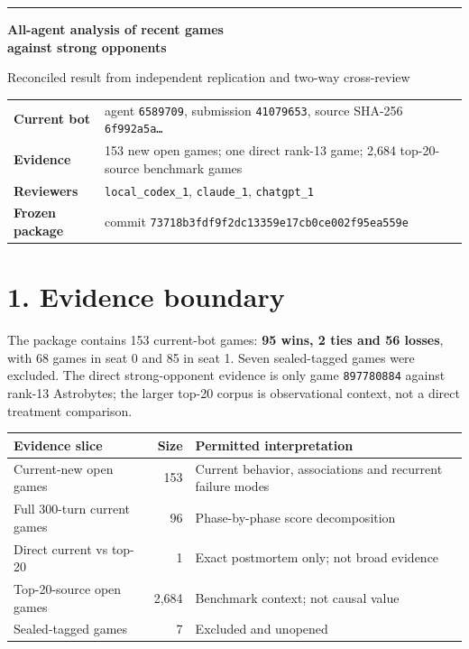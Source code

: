\documentclass[10pt,a4paper]{article}
\begin{document}
{\color{accent}\rule{\textwidth}{1.4pt}}

{\Huge\bfseries\color{ink} All-agent analysis of recent games\\[2mm]
against strong opponents}

{\large\color{muted} Reconciled result from independent replication and two-way cross-review}

\vspace{2mm}
\begin{tabularx}{\textwidth}{@{}lY@{}}
\textbf{Current bot} & agent \texttt{6589709}, submission \texttt{41079653}, source SHA-256 \texttt{6f992a5a…} \\
\textbf{Evidence} & 153 new open games; one direct rank-13 game; 2,684 top-20-source benchmark games \\
\textbf{Reviewers} & \texttt{local\_codex\_1}, \texttt{claude\_1}, \texttt{chatgpt\_1} \\
\textbf{Frozen package} & commit \texttt{73718b3fdf9f2dc13359e17cb0ce002f95ea559e} \\
\end{tabularx}

\vspace{3mm}

\section*{1. Evidence boundary}

The package contains 153 current-bot games: \textbf{95 wins, 2 ties and 56 losses}, with
68 games in seat 0 and 85 in seat 1. Seven sealed-tagged games were excluded. The direct
strong-opponent evidence is only game \texttt{897780884} against rank-13 Astrobytes; the
larger top-20 corpus is observational context, not a direct treatment comparison.

\begin{tabularx}{\textwidth}{@{}l r Y@{}}
\toprule
\textbf{Evidence slice} & \textbf{Size} & \textbf{Permitted interpretation} \\
\midrule
Current-new open games & 153 & Current behavior, associations and recurrent failure modes \\
Full 300-turn current games & 96 & Phase-by-phase score decomposition \\
Direct current vs top-20 & 1 & Exact postmortem only; not broad evidence \\
Top-20-source open games & 2,684 & Benchmark context; not causal value \\
Sealed-tagged games & 7 & Excluded and unopened \\
\bottomrule
\end{tabularx}
\end{document}
